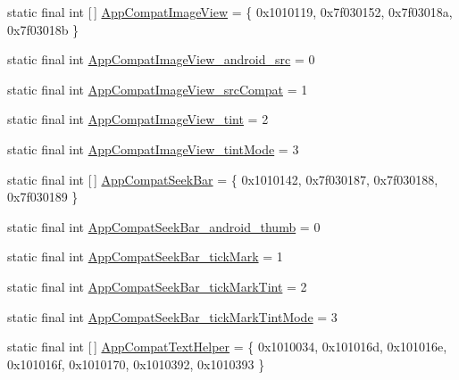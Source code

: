 \begin{DoxyCompactItemize}
static final int \mbox{[}$\,$\mbox{]} \mbox{\hyperlink{classandroid_1_1support_1_1v7_1_1appcompat_1_1_r_1_1styleable_a8d637497c66d3f24c82211c9ec73a3d9}{App\+Compat\+Image\+View}} = \{ 0x1010119, 0x7f030152, 0x7f03018a, 0x7f03018b \}
\item 
static final int \mbox{\hyperlink{classandroid_1_1support_1_1v7_1_1appcompat_1_1_r_1_1styleable_af57205141e7c21bbfa3d98e2683ba0f7}{App\+Compat\+Image\+View\+\_\+android\+\_\+src}} = 0
\item 
static final int \mbox{\hyperlink{classandroid_1_1support_1_1v7_1_1appcompat_1_1_r_1_1styleable_a693c5ce1bfc86d7bc8b9230f077dbdef}{App\+Compat\+Image\+View\+\_\+src\+Compat}} = 1
\item 
static final int \mbox{\hyperlink{classandroid_1_1support_1_1v7_1_1appcompat_1_1_r_1_1styleable_a082d0b8ae5605410aeb02f596febc5d6}{App\+Compat\+Image\+View\+\_\+tint}} = 2
\item 
static final int \mbox{\hyperlink{classandroid_1_1support_1_1v7_1_1appcompat_1_1_r_1_1styleable_a4b31942e5e43356689e7e951bf9c5b5f}{App\+Compat\+Image\+View\+\_\+tint\+Mode}} = 3
\item 
static final int \mbox{[}$\,$\mbox{]} \mbox{\hyperlink{classandroid_1_1support_1_1v7_1_1appcompat_1_1_r_1_1styleable_a01eb64f8495e48b568515c8de894e9cf}{App\+Compat\+Seek\+Bar}} = \{ 0x1010142, 0x7f030187, 0x7f030188, 0x7f030189 \}
\item 
static final int \mbox{\hyperlink{classandroid_1_1support_1_1v7_1_1appcompat_1_1_r_1_1styleable_a811adb8cdc1a83787b5d65eb3afcfb19}{App\+Compat\+Seek\+Bar\+\_\+android\+\_\+thumb}} = 0
\item 
static final int \mbox{\hyperlink{classandroid_1_1support_1_1v7_1_1appcompat_1_1_r_1_1styleable_a5181cde4b228163e06a04917c76db41b}{App\+Compat\+Seek\+Bar\+\_\+tick\+Mark}} = 1
\item 
static final int \mbox{\hyperlink{classandroid_1_1support_1_1v7_1_1appcompat_1_1_r_1_1styleable_a03ada21ed17781a049c6712d9d9a5ce8}{App\+Compat\+Seek\+Bar\+\_\+tick\+Mark\+Tint}} = 2
\item 
static final int \mbox{\hyperlink{classandroid_1_1support_1_1v7_1_1appcompat_1_1_r_1_1styleable_a5d540bd0e84c530cc7d37387f117baca}{App\+Compat\+Seek\+Bar\+\_\+tick\+Mark\+Tint\+Mode}} = 3
\item 
static final int \mbox{[}$\,$\mbox{]} \mbox{\hyperlink{classandroid_1_1support_1_1v7_1_1appcompat_1_1_r_1_1styleable_acd548363be77a276a3dd215719409539}{App\+Compat\+Text\+Helper}} = \{ 0x1010034, 0x101016d, 0x101016e, 0x101016f, 0x1010170, 0x1010392, 0x1010393 \}

\end{DoxyCompactItemize}
